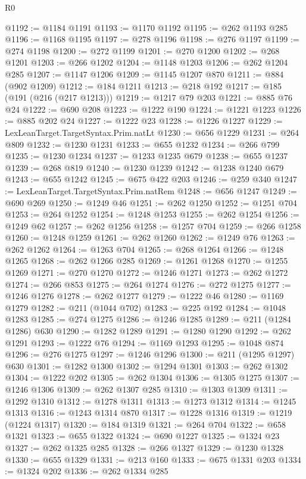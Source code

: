 \begin{lexlean}{R0}
\begin{coremodule}
@1192 := @1184 @1191
@1193 := @1170 @1192
@1195 := @262 @1193 @285
@1196 := @1168 @1195
@1197 := @278 @1196
@1198 := @276 @1197
@1199 := @274 @1198
@1200 := @272 @1199
@1201 := @270 @1200
@1202 := @268 @1201
@1203 := @266 @1202
@1204 := @1148 @1203
@1206 := @262 @1204 @285
@1207 := @1147 @1206
@1209 := @1145 @1207 @870
@1211 := @884 (@902 @1209)
@1212 := @184 @1211
@1213 := @218 @192
@1217 := @185 (@191 (@216 (@217 @1213)))
@1219 := @1217 @79 @203
@1221 := @885 @76 @24
@1222 := @690 @208
@1223 := @1222 @190
@1224 := @1221 @1223
@1226 := @885 @202 @24
@1227 := @1222 @23
@1228 := @1226 @1227
@1229 := LexLeanTarget.TargetSyntax.Prim.natLt
@1230 := @656 @1229
@1231 := @264 @809
@1232 := @1230 @1231
@1233 := @655 @1232
@1234 := @266 @799
@1235 := @1230 @1234
@1237 := @1233 @1235 @679
@1238 := @655 @1237
@1239 := @268 @819
@1240 := @1230 @1239
@1242 := @1238 @1240 @679
@1243 := @655 @1242
@1245 := @675 @422 @203
@1246 := @259 @340
@1247 := LexLeanTarget.TargetSyntax.Prim.natRem
@1248 := @656 @1247
@1249 := @690 @269
@1250 := @1249 @46
@1251 := @262 @1250
@1252 := @1251 @704
@1253 := @264 @1252
@1254 := @1248 @1253
@1255 := @262 @1254
@1256 := @1249 @62
@1257 := @262 @1256
@1258 := @1257 @704
@1259 := @266 @1258
@1260 := @1248 @1259
@1261 := @262 @1260
@1262 := @1249 @76
@1263 := @262 @1262
@1264 := @1263 @704
@1265 := @268 @1264
@1266 := @1248 @1265
@1268 := @262 @1266 @285
@1269 := @1261 @1268
@1270 := @1255 @1269
@1271 := @270 @1270
@1272 := @1246 @1271
@1273 := @262 @1272
@1274 := @266 @853
@1275 := @264 @1274
@1276 := @272 @1275
@1277 := @1246 @1276
@1278 := @262 @1277
@1279 := @1222 @46
@1280 := @1169 @1279
@1282 := @211 (@1044 @702)
@1283 := @225 @192
@1284 := @1048 @1283
@1285 := @274 @1275
@1286 := @1246 @1285
@1289 := @211 (@1284 @1286) @630
@1290 := @1282 @1289
@1291 := @1280 @1290
@1292 := @262 @1291
@1293 := @1222 @76
@1294 := @1169 @1293
@1295 := @1048 @874
@1296 := @276 @1275
@1297 := @1246 @1296
@1300 := @211 (@1295 @1297) @630
@1301 := @1282 @1300
@1302 := @1294 @1301
@1303 := @262 @1302
@1304 := @1222 @202
@1305 := @262 @1304
@1306 := @1305 @1275
@1307 := @1246 @1306
@1309 := @262 @1307 @285
@1310 := @1303 @1309
@1311 := @1292 @1310
@1312 := @1278 @1311
@1313 := @1273 @1312
@1314 := @1245 @1313
@1316 := @1243 @1314 @870
@1317 := @1228 @1316
@1319 := @1219 (@1224 @1317)
@1320 := @184 @1319
@1321 := @264 @704
@1322 := @658 @1321
@1323 := @655 @1322
@1324 := @690 @1227
@1325 := @1324 @23
@1327 := @262 @1325 @285
@1328 := @266 @1327
@1329 := @1230 @1328
@1330 := @655 @1329
@1331 := @213 @160
@1333 := @675 @1331 @203
@1334 := @1324 @202
@1336 := @262 @1334 @285

\end{coremodule}
\end{lexlean}
